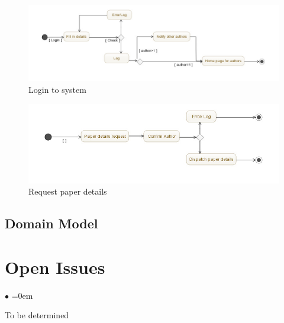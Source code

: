 \documentclass[english]{article}
\begin{document}
\begin{itemize}
\begin{figure}
				\end{figure}
				\begin{figure}
					\includegraphics[width=\linewidth]{Activity.Login.jpg}
					\caption{Login to system}
				\end{figure}
				\begin{figure}
					\includegraphics[width=\linewidth]{Pictures/Request.Paper.jpg}
					\caption{Request paper details}
				\end{figure}
			\end{itemize}

		\subsection{Domain Model}

	\section{Open Issues}
		\begin{list}{$\bullet$}{\leftmargin=1.5cm \itemindent=0em}
			\item To be determined
		\end{list}
\end{document}
